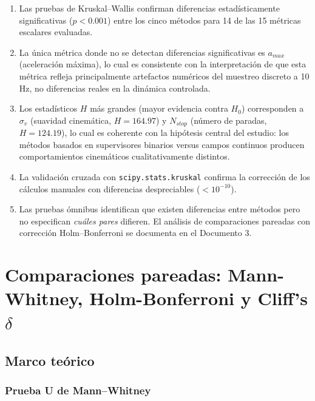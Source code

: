 \documentclass[12pt,a4paper,oneside]{book}
\begin{document}
\begin{enumerate}[leftmargin=*]
    \item Las pruebas de Kruskal--Wallis confirman diferencias estadísticamente significativas ($p<0.001$) entre los cinco métodos para 14 de las 15 métricas escalares evaluadas.
    
    \item La única métrica donde no se detectan diferencias significativas es $a_{max}$ (aceleración máxima), lo cual es consistente con la interpretación de que esta métrica refleja principalmente artefactos numéricos del muestreo discreto a 10 Hz, no diferencias reales en la dinámica controlada.
    
    \item Los estadísticos $H$ más grandes (mayor evidencia contra $H_0$) corresponden a $\sigma_v$ (suavidad cinemática, $H=164.97$) y $N_{stop}$ (número de paradas, $H=124.19$), lo cual es coherente con la hipótesis central del estudio: los métodos basados en supervisores binarios versus campos continuos producen comportamientos cinemáticos cualitativamente distintos.
    
    \item La validación cruzada con \texttt{scipy.stats.kruskal} confirma la corrección de los cálculos manuales con diferencias despreciables ($<10^{-10}$).
    
    \item Las pruebas ómnibus identifican que existen diferencias entre métodos pero no especifican \emph{cuáles pares} difieren. El análisis de comparaciones pareadas con corrección Holm--Bonferroni se documenta en el Documento 3.
\end{enumerate}



\chapter{Comparaciones pareadas: Mann-Whitney, Holm-Bonferroni y Cliff's $\delta$}
\label{chap:mannwhitney}




\section{Marco teórico}

\subsection{Prueba U de Mann--Whitney}
\end{document}
